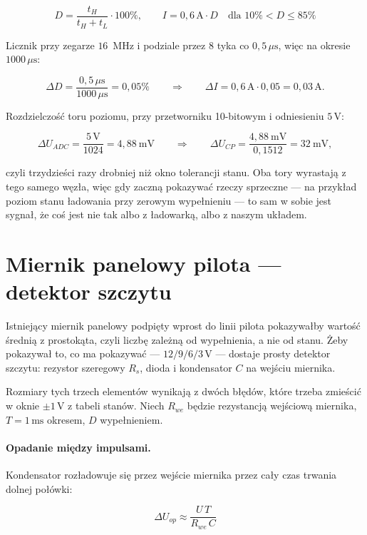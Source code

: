 \documentclass[a4paper,11pt]{article}
\newcommand{\volt}{\,\mathrm{V}}
\newcommand{\amp}{\,\mathrm{A}}
\newcommand{\us}{\,\mu\mathrm{s}}
\newcommand{\ms}{\,\mathrm{ms}}
\begin{document}
\begin{equation}
D=\frac{t_H}{t_H+t_L}\cdot100\%,
\qquad
I = 0{,}6\amp\cdot D \quad\text{dla } 10\% < D \le 85\%
\end{equation}

Licznik przy zegarze $16$~MHz i podziale przez $8$ tyka co $0{,}5\us$, więc na
okresie $1000\us$:

\[
\Delta D=\frac{0{,}5\us}{1000\us}=0{,}05\%
\qquad\Longrightarrow\qquad
\Delta I = 0{,}6\amp\cdot0{,}05=0{,}03\amp .
\]

Rozdzielczość toru poziomu, przy przetworniku 10-bitowym i odniesieniu $5\volt$:

\[
\Delta U_{ADC}=\frac{5\volt}{1024}=4{,}88\ \mathrm{mV}
\qquad\Longrightarrow\qquad
\Delta U_{CP}=\frac{4{,}88\ \mathrm{mV}}{0{,}1512}=32\ \mathrm{mV},
\]

czyli trzydzieści razy drobniej niż okno tolerancji stanu. Oba tory wyrastają
z tego samego węzła, więc gdy zaczną pokazywać rzeczy sprzeczne --- na przykład
poziom stanu ładowania przy zerowym wypełnieniu --- to sam w sobie jest sygnał,
że coś jest nie tak albo z ładowarką, albo z naszym układem.

\section{Miernik panelowy pilota --- detektor szczytu}
\label{sec:szczyt}

Istniejący miernik panelowy podpięty wprost do linii pilota pokazywałby wartość
średnią z prostokąta, czyli liczbę zależną od wypełnienia, a nie od stanu. Żeby
pokazywał to, co ma pokazywać --- $12/9/6/3\volt$ --- dostaje prosty detektor
szczytu: rezystor szeregowy $R_s$, dioda i kondensator $C$ na wejściu miernika.

Rozmiary tych trzech elementów wynikają z dwóch błędów, które trzeba zmieścić
w oknie $\pm1\volt$ z tabeli stanów. Niech $R_{we}$ będzie rezystancją wejściową
miernika, $T=1\ms$ okresem, $D$ wypełnieniem.

\paragraph{Opadanie między impulsami.} Kondensator rozładowuje się przez wejście
miernika przez cały czas trwania dolnej połówki:

\begin{equation}
\Delta U_{op}\approx\frac{U\,T}{R_{we}\,C}
\label{eq:opadanie}
\end{equation}
\end{document}
